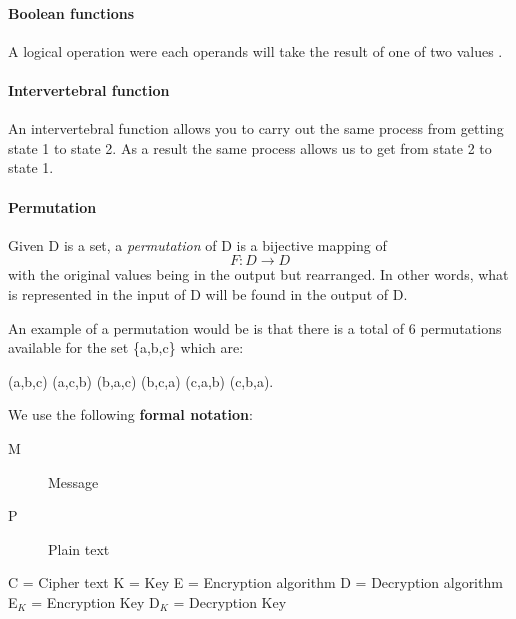 \documentclass[11pt,a4paper]{report}
\begin{document}
\paragraph{Boolean functions}
A logical operation were each operands will take the result of one of two values \cite{Gregory2013Cryptanalysis}.

\paragraph{Intervertebral function}
An intervertebral function allows you to carry out the
same process from getting state 1 to state 2. As a result the same process
allows us to get from state 2 to state 1.

\paragraph{Permutation}
Given D is a set, a \emph{permutation} of D is a bijective mapping of
\begin{displaymath}
F: D \rightarrow D
\end{displaymath}
with the original values being in the output but rearranged. In other words, what is represented in the input of D will be found in the output of D.

An example of a permutation would be is that there is a total of 6 permutations available for the set \{a,b,c\} which are:
\begin{center}
(a,b,c) (a,c,b) (b,a,c) (b,c,a) (c,a,b) (c,b,a).
\end{center}


We use the following \textbf{formal notation}:
\begin{description}
\item[M] Message
\item[P] Plain text
\end{description}
C = Cipher text
K = Key
E = Encryption algorithm
D = Decryption algorithm
E$_{K}$ = Encryption Key
D$_{K}$ = Decryption Key
\end{document}

